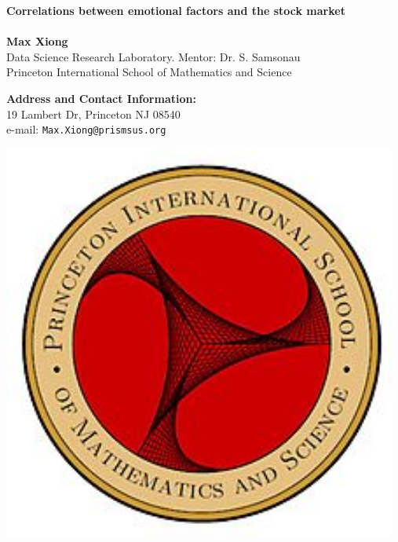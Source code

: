 \documentclass[a0,landscape]{a0poster}\usepackage[]{graphicx}\usepackage[]{color}
\begin{document}



\begin{minipage}[b]{0.65\linewidth}
\veryHuge \color{NavyBlue} \textbf{Correlations between emotional factors and the stock market} \color{Black}\\ \\%
\huge \textbf{Max Xiong}\\ %
\huge Data Science Research Laboratory. Mentor: Dr. S. Samsonau\\ %
\huge Princeton International School of Mathematics and Science\\ %
\end{minipage}
%
\begin{minipage}[b]{0.2\linewidth}
\color{DarkSlateGray}\Large \textbf{Address and Contact Information:}\\
19 Lambert Dr, Princeton NJ 08540\\ %
e-mail: \texttt{Max.Xiong@prismsus.org}\\ %
\end{minipage}
%
\begin{minipage}[b]{0.14\linewidth}
\includegraphics[width=13cm]{PRISMS_Logo.jpg} %
\end{minipage}
\end{document}

